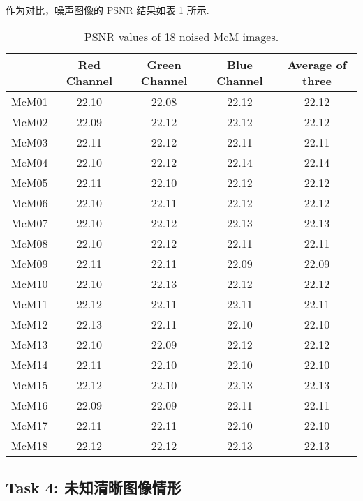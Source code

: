 \documentclass[10.5pt]{myarticle}
\begin{document}
作为对比，噪声图像的 PSNR 结果如表 \ref{tab:noisy_task3} 所示. 

\begin{table}[H]
	\centering
	\caption{PSNR values of 18 noised McM images.}
	\label{tab:noisy_task3}
	\begin{tabular}{|c|c|c|c|c|}
	\hline
		 & Red Channel & Green Channel & Blue Channel & Average of three \\ \hline
		McM01 & 22.10 & 22.08 & 22.12 & 22.12 \\ \hline
		McM02 & 22.09 & 22.12 & 22.12 & 22.12 \\ \hline
		McM03 & 22.11 & 22.12 & 22.11 & 22.11 \\ \hline
		McM04 & 22.10 & 22.12 & 22.14 & 22.14 \\ \hline
		McM05 & 22.11 & 22.10 & 22.12 & 22.12 \\ \hline
		McM06 & 22.10 & 22.11 & 22.12 & 22.12 \\ \hline
		McM07 & 22.10 & 22.12 & 22.13 & 22.13 \\ \hline
		McM08 & 22.10 & 22.12 & 22.11 & 22.11 \\ \hline
		McM09 & 22.11 & 22.11 & 22.09 & 22.09 \\ \hline
		McM10 & 22.10 & 22.13 & 22.12 & 22.12 \\ \hline
		McM11 & 22.12 & 22.11 & 22.11 & 22.11 \\ \hline
		McM12 & 22.13 & 22.11 & 22.10 & 22.10 \\ \hline
		McM13 & 22.10 & 22.09 & 22.12 & 22.12 \\ \hline
		McM14 & 22.11 & 22.10 & 22.10 & 22.10 \\ \hline
		McM15 & 22.12 & 22.10 & 22.13 & 22.13 \\ \hline
		McM16 & 22.09 & 22.09 & 22.11 & 22.11 \\ \hline
		McM17 & 22.11 & 22.11 & 22.10 & 22.10 \\ \hline
		McM18 & 22.12 & 22.12 & 22.13 & 22.13 \\ \hline
	\end{tabular}
\end{table}


\clearpage


\subsection{Task 4: 未知清晰图像情形}
\end{document}
